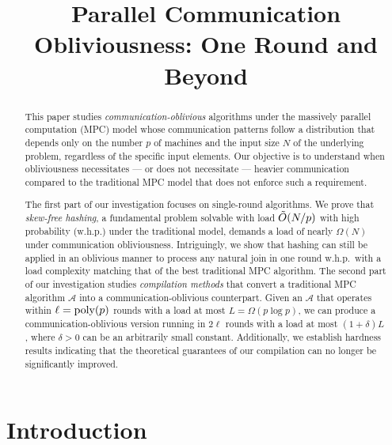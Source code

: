 \documentclass[sigconf]{acmart}
\def\vgap{\vspace{0mm}}
\def\A{\mathcal{A}}
\begin{document}
    
\title{Parallel Communication Obliviousness: One Round and Beyond}


\author{}


\begin{abstract}
    This paper studies {\em communication-oblivious} algorithms under the massively parallel computation (MPC) model whose communication patterns follow a distribution that depends only on the number $p$ of machines and the input size $N$ of the underlying problem, regardless of the specific input elements. Our objective is to understand when obliviousness necessitates --- or does not necessitate --- heavier communication compared to the traditional MPC model that does not enforce such a requirement.

    \vgap

    The first part of our investigation focuses on single-round algorithms. We prove that {\em skew-free hashing}, a fundamental problem solvable with load $\tilde{O}(N/p)$ with high probability (w.h.p.) under the traditional model, demands a load of nearly $\Omega(N)$ under communication obliviousness. Intriguingly, we show that hashing can still be applied in an oblivious manner to process any natural join in one round w.h.p.\ with a load complexity matching that of the best traditional MPC algorithm. The second part of our investigation studies {\em compilation methods} that convert a traditional MPC algorithm $\A$ into a communication-oblivious counterpart. Given an $\A$ that operates within $\ell = \operatorname*{poly}(p)$ rounds with a load at most $L = \Omega(p \log p)$, we can produce a communication-oblivious version running in $2\ell$ rounds with a load at most $(1 + \delta) L$, where $\delta > 0$ can be an arbitrarily small constant. Additionally, we establish hardness results indicating that the theoretical guarantees of our compilation can no longer be significantly improved.
\end{abstract}

\maketitle 

\section{Introduction} \label{sec:intro}
\end{document}
